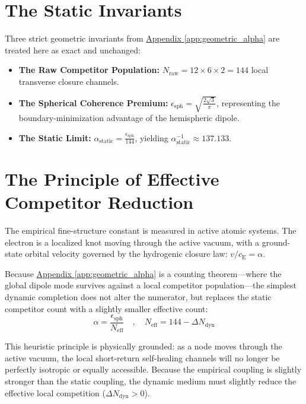 \section{The Static Invariants}
Three strict geometric invariants from \hyperref[app:geometric_alpha]{Appendix \ref*{app:geometric_alpha}} are treated here as exact and unchanged:
\begin{itemize}
    \item \textbf{The Raw Competitor Population:} $N_{\mathrm{raw}} = 12 \times 6 \times 2 = 144$ local transverse closure channels.
    \item \textbf{The Spherical Coherence Premium:} $\epsilon_{\mathrm{sph}} = \sqrt{\frac{2\sqrt{3}}{\pi}}$, representing the boundary-minimization advantage of the hemispheric dipole.
    \item \textbf{The Static Limit:} $\alpha_{\mathrm{static}} = \frac{\epsilon_{\mathrm{sph}}}{144}$, yielding $\alpha_{\mathrm{static}}^{-1} \approx 137.133$.
\end{itemize}

\section{The Principle of Effective Competitor Reduction}
The empirical fine-structure constant is measured in active atomic systems. The electron is a localized knot moving through the active vacuum, with a ground-state orbital velocity governed by the hydrogenic closure law: $v/c_{\mathrm{E}} = \alpha$.

Because \hyperref[app:geometric_alpha]{Appendix \ref*{app:geometric_alpha}} is a counting theorem---where the global dipole mode survives against a local competitor population---the simplest dynamic completion does not alter the numerator, but replaces the static competitor count with a slightly smaller effective count:
\begin{equation}
    \alpha = \frac{\epsilon_{\mathrm{sph}}}{N_{\mathrm{eff}}} \quad , \quad N_{\mathrm{eff}} = 144 - \Delta N_{\mathrm{dyn}}
\end{equation}

This heuristic principle is physically grounded: as a node moves through the active vacuum, the local short-return self-healing channels will no longer be perfectly isotropic or equally accessible. Because the empirical coupling is slightly stronger than the static coupling, the dynamic medium must slightly reduce the effective local competition ($\Delta N_{\mathrm{dyn}} > 0$).

